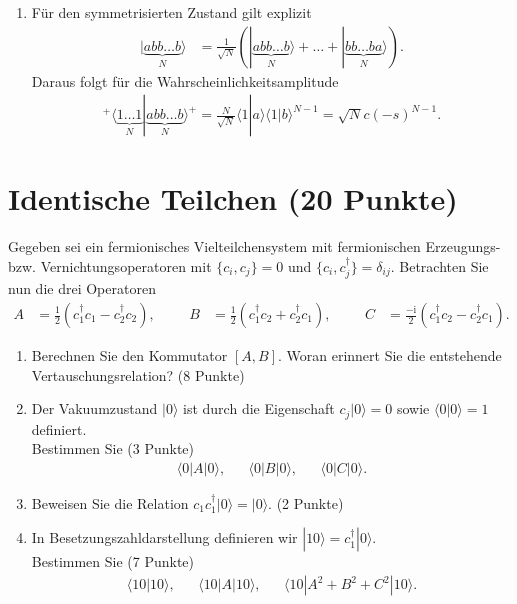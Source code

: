 \documentclass[german, parskip=full]{scrartcl}
\newcommand{\brak}{}
\newcommand{\braket}{}
\newcommand{\kla}{}
\newcommand{\Ket}{}
\newcommand{\I}{\text{i}}
\begin{document}
\begin{enumerate}
\item[e)] Für den symmetrisierten Zustand gilt explizit
\begin{align*}
\Ket | {\underbrace{abb\dots b}_N} \rangle&=\frac{1}{\sqrt{N}}\kla\left( {\Ket | {\underbrace{abb\dots b}_N} \rangle+\dots +\Ket | {\underbrace{bb\dots ba}_N} \rangle} \right).
\end{align*}
Daraus folgt für die Wahrscheinlichkeitsamplitude
\begin{align*}
{}^+\brak\langle {\underbrace{1\dots 1}_N}| {\underbrace{abb\dots b}_N}\rangle^+=\frac{N}{\sqrt{N}}\brak\langle {1}| {a}\rangle\brak\langle {1}| {b}\rangle^{N-1}=\sqrt{N}c(-s)^{N-1}.
\end{align*}
\end{enumerate}
\newpage
\section{Identische Teilchen (20 Punkte)}
Gegeben sei ein fermionisches Vielteilchensystem mit
fermionischen Erzeugungs- bzw. Vernichtungsoperatoren mit $\{c_i,c_j\}=0$ und $\{c_i,c_j^\dagger\}=\delta_{ij}$. 
Betrachten Sie nun die drei Operatoren
\begin{align}
A&=\frac{1}{2}\kla\left( {c_1^\dagger c_1-c_2^\dagger c_2} \right),&&&B&=\frac{1}{2}\kla\left( {c_1^\dagger c_2+c_2^\dagger c_1} \right),&&&C&=\frac{-\I}{2}\kla\left( {c_1^\dagger c_2-c_2^\dagger c_1} \right).
\end{align}
\begin{enumerate}
\item[a)] Berechnen Sie den Kommutator $[A, B]$.
Woran erinnert Sie die entstehende Vertauschungsrelation? (8 Punkte)
\item[b)] Der Vakuumzustand $|0\rangle $ ist durch die Eigenschaft $c_j |0\rangle = 0$ sowie $\langle 0|0\rangle = 1$ definiert.\\ 
Bestimmen Sie \hfill (3 Punkte)
\begin{align}
\braket\langle {0} | {A} | {0}\rangle,&&\braket\langle {0} | {B} | {0}\rangle,&&\braket\langle {0} | {C} | {0}\rangle.
\end{align}
\item[c)] Beweisen Sie die Relation $c_1c_1^\dagger\Ket | {0} \rangle=\Ket | {0} \rangle$. (2 Punkte)
\item[d)] In Besetzungszahldarstellung definieren wir $\Ket | {10} \rangle=c_1^\dagger\Ket | {0} \rangle$.\\
Bestimmen Sie \hfill (7 Punkte)
\begin{align}
\brak\langle {10}| {10}\rangle,&&\braket\langle {10} | {A} | {10}\rangle,&&\braket\langle {10} | {A^2+B^2+C^2} | {10}\rangle.
\end{align}
\end{enumerate}
\newpage
\end{document}
